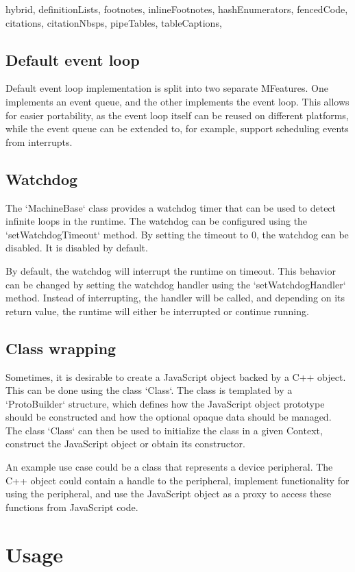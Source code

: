 \begin{markdown*}{%
  hybrid,
  definitionLists,
  footnotes,
  inlineFootnotes,
  hashEnumerators,
  fencedCode,
  citations,
  citationNbsps,
  pipeTables,
  tableCaptions,
}
\subsection{Default event loop}

Default event loop implementation is split into two separate MFeatures. One implements an event queue, and the other implements the event loop. This allows for easier portability, as the event loop itself can be reused on different platforms, while the event queue can be extended to, for example, support scheduling events from interrupts.

\subsection{Watchdog}

The `MachineBase` class provides a watchdog timer that can be used to detect infinite loops in the runtime. The watchdog can be configured using the `setWatchdogTimeout` method. By setting the timeout to 0, the watchdog can be disabled. It is disabled by default.

By default, the watchdog will interrupt the runtime on timeout. This behavior can be changed by setting the watchdog handler using the `setWatchdogHandler` method. Instead of interrupting, the handler will be called, and depending on its return value, the runtime will either be interrupted or continue running.

\subsection{Class wrapping} \label{sub:class-wrapping}

Sometimes, it is desirable to create a JavaScript object backed by a C++ object. This can be done using the class `Class`. The class is templated by a `ProtoBuilder` structure, which defines how the JavaScript object prototype should be constructed and how the optional opaque data should be managed. The class `Class` can then be used to initialize the class in a given Context, construct the JavaScript object or obtain its constructor.

An example use case could be a class that represents a device peripheral. The C++ object could contain a handle to the peripheral, implement functionality for using the peripheral, and use the JavaScript object as a proxy to access these functions from JavaScript code.


\section{Usage} \label{sec:machine-usage}


\end{markdown*}
